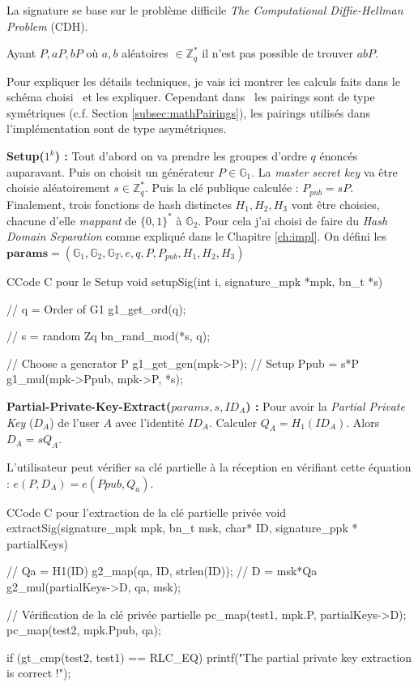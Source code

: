 La signature se base sur le problème difficile \textit{The Computational Diffie-Hellman Problem} (CDH). 

Ayant $P, aP, bP$ où $a,b$ aléatoires $\in \mathbb{Z}_q^*$ il n'est pas possible de trouver $abP$.

Pour expliquer les détails techniques, je vais ici montrer les calculs faits dans le schéma choisi~\cite{conf/acns/ZhangWXF06} et les expliquer. Cependant dans~\cite{conf/acns/ZhangWXF06} les pairings sont de type symétriques (c.f. Section \ref{subsec:mathPairings}), les pairings utilisés dans l'implémentation sont de type asymétriques.

\textbf{Setup($1^k $) :} Tout d'abord on va prendre les groupes d'ordre $q$ énoncés auparavant. Puis on choisit un générateur $P \in \mathbb{G}_1$. La \textit{master secret key} va être choisie aléatoirement $s \in \mathbb{Z}_q^*$. Puis la clé publique calculée : $P_{pub} = sP$. Finalement, trois fonctions de hash distinctes $H_1, H_2, H_3$ vont être choisies, chacune d'elle \textit{mappant} de $\{0,1\}^*$ à $\mathbb{G}_2$. Pour cela j'ai choisi de faire du \textit{Hash Domain Separation} comme expliqué dans le Chapitre \ref{ch:impl}. On défini les $\mathbf{params} = (\mathbb{G}_1,\mathbb{G}_2,\mathbb{G}_T,e,q,P,P_{pub},H_1,H_2,H_3)$

\begin{sourcebox}{C}{Code C pour le Setup}
	void setupSig(int i, signature_mpk *mpk, bn_t *s){
		// q = Order of G1
		g1_get_ord(q);
		
		// s = random Zq
		bn_rand_mod(*s, q);
		
		// Choose a generator P
		g1_get_gen(mpk->P);
		// Setup Ppub = s*P
		g1_mul(mpk->Ppub, mpk->P, *s);
	}
\end{sourcebox}

\textbf{Partial-Private-Key-Extract($params, s, ID_A$) :} Pour avoir la \textit{Partial Private Key} ($D_A$) de l'user $A$ avec l'identité $ID_A$. Calculer $Q_A = H_1(ID_A)$. Alors $D_A = sQ_A$.

L'utilisateur peut vérifier sa clé partielle à la réception en vérifiant cette équation : $e(P, D_A) = e(Ppub, Q_a)$.

\begin{sourcebox}{C}{Code C pour l'extraction de la clé partielle privée}
	void extractSig(signature_mpk mpk, bn_t msk, char* ID, signature_ppk * partialKeys) {
		// Qa = H1(ID)
		g2_map(qa, ID, strlen(ID));
		// D = msk*Qa
		g2_mul(partialKeys->D, qa, msk);
		
		// Vérification de la clé privée partielle
		pc_map(test1, mpk.P, partialKeys->D);
		pc_map(test2, mpk.Ppub, qa);
		
		if (gt_cmp(test2, test1) == RLC_EQ) {
			printf("The partial private key extraction is correct !\n");
		}
	}
\end{sourcebox}


